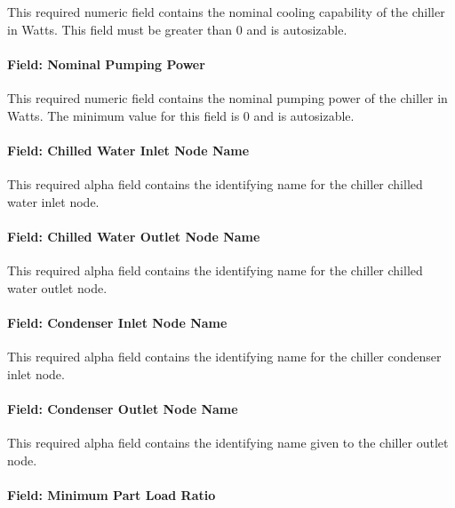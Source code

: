 This required numeric field contains the nominal cooling capability of the chiller in Watts. This field must be greater than 0 and is autosizable.

\paragraph{Field: Nominal Pumping Power}\label{field-nominal-pumping-power-1}

This required numeric field contains the nominal pumping power of the chiller in Watts. The minimum value for this field is 0 and is autosizable.

\paragraph{Field: Chilled Water Inlet Node Name}\label{field-chilled-water-inlet-node-name-1-000}

This required alpha field contains the identifying name for the chiller chilled water inlet node.

\paragraph{Field: Chilled Water Outlet Node Name}\label{field-chilled-water-outlet-node-name-1-000}

This required alpha field contains the identifying name for the chiller chilled water outlet node.

\paragraph{Field: Condenser Inlet Node Name}\label{field-condenser-inlet-node-name-1}

This required alpha field contains the identifying name for the chiller condenser inlet node.

\paragraph{Field: Condenser Outlet Node Name}\label{field-condenser-outlet-node-name-1}

This required alpha field contains the identifying name given to the chiller outlet node.

\paragraph{Field: Minimum Part Load Ratio}\label{field-minimum-part-load-ratio-1-001}

